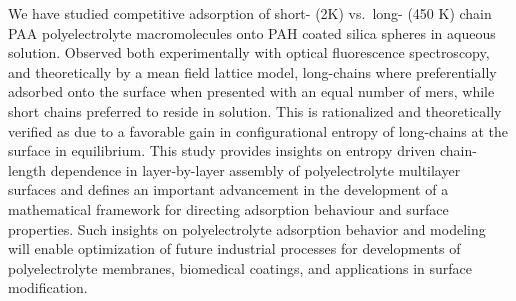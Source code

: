 \documentclass[journal=mamobx,manuscript=article]{achemso}
\begin{document}
We have studied competitive adsorption of short- (2K) vs.\ long- (450 K) chain PAA polyelectrolyte macromolecules onto PAH coated silica spheres in aqueous solution. Observed both experimentally with optical fluorescence spectroscopy, and theoretically by a mean field lattice model, long-chains where preferentially adsorbed onto the surface when presented with an equal number of mers, while short chains preferred to reside in solution. This is rationalized and theoretically verified as due to a favorable gain in configurational entropy of long-chains at the surface in equilibrium. This study provides insights on entropy driven chain-length dependence in layer-by-layer assembly of polyelectrolyte multilayer surfaces and defines an important advancement in the development of a mathematical framework for directing adsorption behaviour and surface properties. Such insights on polyelectrolyte adsorption behavior and modeling will enable optimization of future industrial processes for developments of polyelectrolyte membranes, biomedical coatings, and applications in surface modification.





\end{document}
